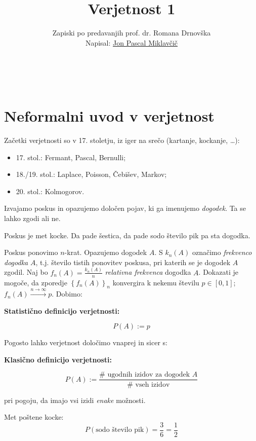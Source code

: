 \documentclass[12pt]{book}
\title{\Huge Verjetnost 1}
\author{\small Zapiski po predavanjih prof. dr. Romana Drnovška \\ Napisal: \href{https://github.com/jonpascal/VER1-zapiski-predavanj}{Jon Pascal Miklavčič}}
\date{\filemodprintdate{\jobname}}
\makeatletter
\renewcommand{\maketitle}{
  \begin{titlepage}
    \begin{center}
      \vspace*{25mm} 
      \Huge\@title\par 
      \vspace{20mm} 
      \large\@author \\
      \vspace{140mm} 
      \large\@date\par 
    \end{center}
  \end{titlepage}
}
\def\n{\noindent}
\theoremstyle{definition}
\theoremstyle{plain}
\theoremstyle{plain}
\theoremstyle{plain}
\theoremstyle{remark}
\makeatother
\begin{document}
\frontmatter

\maketitle

\tableofcontents

\mainmatter

\chapter{Neformalni uvod v verjetnost}

Začetki verjetnosti so v 17. stoletju, iz iger na srečo (kartanje, kockanje, \dots): 
\begin{itemize}
    \item 17. stol.: Fermant, Pascal, Bernulli;
    \item 18./19. stol.: Laplace, Poisson, Čebišev, Markov;
    \item 20. stol.: Kolmogorov.
\end{itemize}

\n Izvajamo poskus in opazujemo določen pojav, ki ga imenujemo \emph{dogodek}. Ta se lahko zgodi ali ne. 

\begin{zgled}
    Poskus je met kocke. Da pade šestica, da pade sodo število pik pa sta dogodka.
\end{zgled}

\n Poskus ponovimo $n$-krat. Opazujemo dogodek $A$. S $k_n(A)$ označimo \emph{frekvenco dogodka} $A$, t.j. število tistih ponovitev poskusa, pri katerih se je dogodek $A$ zgodil. Naj bo $f_n(A)=\frac{k_n(A)}{n}$ \emph{relativna frekvenca} dogodka $A$. Dokazati je mogoče, da zporedje $\left\{f_n(A)\right\}_n$ konvergira k nekemu številu $p \in [0, 1]$; $f_n(A) \xrightarrow{n \to \infty} p$. Dobimo:

\textbf{Statistično definicijo verjetnosti:}

$$
P(A):= p 
$$

\n Pogosto lahko verjetnost določimo vnaprej in sicer s: 

\textbf{Klasično definicijo verjetnosti:}

$$
P(A):= \frac{\# \text{ ugodnih izidov za dogodek } A}{\# \text{ vseh izidov}}
$$

pri pogoju, da imajo vsi izidi \emph{enake} možnosti.

\begin{zgled}
    Met poštene kocke: 
    $$
    P(\text{sodo število pik}) = \frac{3}{6} = \frac{1}{2}
    $$
\end{zgled}
\end{document}
